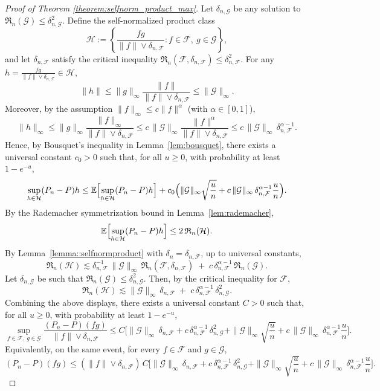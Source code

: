 \documentclass[11pt]{article}
\theoremstyle{plain}
\theoremstyle{definition} %
\begin{document}
\begin{proof}[Proof of Theorem \ref{theorem:selfnorm_product_max}]
Let $\delta_{n,\mathcal G}$ be any solution to $\mathfrak{R}_n(\mathcal G)\le \delta_{n,\mathcal G}^2$. Define the self-normalized product class
\[
\mathcal{H}
:=
\left\{\frac{fg}{\|f\|\vee \delta_{n,\mathcal F}} : f\in\mathcal{F},\ g\in\mathcal{G}\right\},
\]
and let \(\delta_{n,\mathcal F}\) satisfy the critical inequality
\(\mathfrak R_n(\mathcal F,\delta_{n,\mathcal F})\le \delta_{n,\mathcal F}^2\).
For any \(h=\frac{fg}{\|f\|\vee \delta_{n,\mathcal F}}\in\mathcal H\),
\[
\|h\|
\le
\|g\|_\infty \frac{\|f\|}{\|f\|\vee \delta_{n,\mathcal F}}
\le
\|\mathcal G\|_\infty.
\]
Moreover, by the assumption \(\|f\|_\infty \le c\|f\|^\alpha\) (with \(\alpha\in[0,1]\)),
\[
\|h\|_\infty
\le
\|g\|_\infty \frac{\|f\|_\infty}{\|f\|\vee \delta_{n,\mathcal F}}
\le
c\,\|\mathcal G\|_\infty \frac{\|f\|^\alpha}{\|f\|\vee \delta_{n,\mathcal F}}
\le
c\,\|\mathcal G\|_\infty\,\delta_{n,\mathcal F}^{\alpha-1}.
\]
Hence, by Bousquet's inequality in Lemma~\ref{lem:bousquet}, there exists a universal
constant \(c_0>0\) such that, for all \(u\ge 0\), with probability at least \(1-e^{-u}\),
\[
\sup_{h\in\mathcal H}(P_n-P)h
\le
\mathbb E\Bigl[\sup_{h\in\mathcal H}(P_n-P)h\Bigr]
+
c_0\Bigl(
\|\mathcal G\|_\infty\sqrt{\frac{u}{n}}
+
c\,\|\mathcal G\|_\infty\,\delta_{n,\mathcal F}^{\alpha-1}\frac{u}{n}
\Bigr).
\]
By the Rademacher symmetrization bound in Lemma~\ref{lem:rademacher},
\[
\mathbb E\Bigl[\sup_{h\in\mathcal H}(P_n-P)h\Bigr]
\le
2\,\mathfrak R_n(\mathcal H).
\]
By Lemma~\ref{lemma::selfnormproduct} with \(\delta_n=\delta_{n,\mathcal F}\),
up to universal constants,
\[
\mathfrak R_n(\mathcal H)
\lesssim
\delta_{n,\mathcal F}^{-1}\,\|\mathcal G\|_\infty\,\mathfrak R_n(\mathcal F,\delta_{n,\mathcal F})
\;+\;
c\,\delta_{n,\mathcal F}^{\alpha-1}\,\mathfrak R_n(\mathcal G).
\]
Let \(\delta_{n,\mathcal G}\) be such that \(\mathfrak R_n(\mathcal G)\le \delta_{n,\mathcal G}^2\).
Then, by the critical inequality for \(\mathcal F\),
\[
\mathfrak R_n(\mathcal H)
\lesssim
\|\mathcal G\|_\infty\,\delta_{n,\mathcal F}
\;+\;
c\,\delta_{n,\mathcal F}^{\alpha-1}\,\delta_{n,\mathcal G}^2.
\]
Combining the above displays, there exists a universal constant \(C>0\) such that,
for all \(u\ge 0\), with probability at least \(1-e^{-u}\),
\[
\sup_{f\in\mathcal F,\ g\in\mathcal G}
\frac{(P_n-P)(fg)}{\|f\|\vee \delta_{n,\mathcal F}}
\le
C\Biggl[
\|\mathcal G\|_\infty\,\delta_{n,\mathcal F}
+
c\,\delta_{n,\mathcal F}^{\alpha-1}\,\delta_{n,\mathcal G}^2
+
\|\mathcal G\|_\infty\sqrt{\frac{u}{n}}
+
c\,\|\mathcal G\|_\infty\,\delta_{n,\mathcal F}^{\alpha-1}\frac{u}{n}
\Biggr].
\]
Equivalently, on the same event, for every \(f\in\mathcal F\) and \(g\in\mathcal G\),
\[
(P_n-P)(fg)
\le
(\|f\|\vee \delta_{n,\mathcal F})\,
C\Biggl[
\|\mathcal G\|_\infty\,\delta_{n,\mathcal F}
+
c\,\delta_{n,\mathcal F}^{\alpha-1}\,\delta_{n,\mathcal G}^2
+
\|\mathcal G\|_\infty\sqrt{\frac{u}{n}}
+
c\,\|\mathcal G\|_\infty\,\delta_{n,\mathcal F}^{\alpha-1}\frac{u}{n}
\Biggr].
\]



\end{proof}
\end{document}
